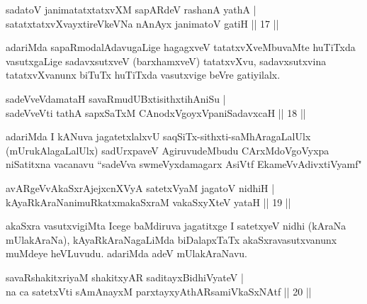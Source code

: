 
\begin{shl}
sadatoV janimatatxtatxvXM sapARdeV rashanA yathA |\\
satatxtatxvXvayxtireVkeVNa nAnAyx janimatoV gatiH \hfill || 17 ||
\end{shl}

\begin{artha}%
adariMda sapaRmodalAdavugaLige hagagxveV tatatxvXveMbuvaMte huTiTxda vasutx\-gaLige sadavxsutxveV (barxhamxveV) tatatxvXvu, sadavxsutxvina tatatxvXvanunx biTuTx huTiTxda vasutxvige beVre gatiyilalx.
\end{artha}


\begin{shl}
sadeVveVdamataH savaRmudUBxtisithxtihAniSu |\\
sadeVveVti tathA sapxSaTxM CAnodxVgoyxVpaniSadavxcaH \hfill || 18 ||
\end{shl}

\begin{artha}
adariMda I kANuva jagatetxlalxvU saqSiTx-sithxti-saMhAragaLalUlx (mUrukAla\-gaLalUlx) sadUrxpaveV AgiruvudeMbudu CArxMdoVgoVyxpa niSatitxna vacanavu ``sadeVva swmeVyxdamagarx AsiVtf EkameVvAdivxtiVyamf" 
\end{artha}

\begin{shl}
avARgeVvAkaSxrAjejxcnXVyA satetxVyaM jagatoV nidhiH |\\
kAyaRkAraNanimuRkatxmakaSxraM vakaSxyXteV yataH \hfill || 19 ||
\end{shl}

\begin{artha}
akaSxra vasutxvigiMta Icege baMdiruva jagatitxge I satetxyeV nidhi (kAraNa mUlakAraNa), kAyaRkAraNagaLiMda biDalapxTaTx akaSxravasutxvanunx muMdeye heVLuvudu. adariMda adeV mUlakAraNavu.
\end{artha}

\begin{shl}
savaRshakitxriyaM shakitxyAR saditayxBidhiVyateV |\\
na ca satetxVti \footnotemark[1]{}sAmAnayxM parxtayxyAthARsamiVkaSxNAtf \hfill || 20 ||
\end{shl}

